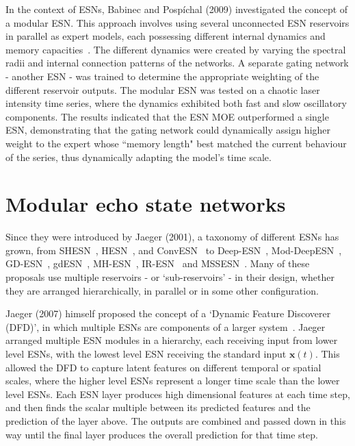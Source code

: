 In the context of ESNs, Babinec and Posp\'ichal (2009) investigated the concept of a modular ESN. This approach involves using several unconnected ESN reservoirs in parallel as expert models, each possessing different internal dynamics and memory capacities~\cite{babinec_pospichal_2009}. The different dynamics were created by varying the spectral radii and internal connection patterns of the networks. A separate gating network - another ESN - was trained to determine the appropriate weighting of the different reservoir outputs. The modular ESN was tested on a chaotic laser intensity time series, where the dynamics exhibited both fast and slow oscillatory components. The results indicated that the ESN MOE outperformed a single ESN, demonstrating that the gating network could dynamically assign higher weight to the expert whose ``memory length" best matched the current behaviour of the series, thus dynamically adapting the model's time scale. 

 

\section{Modular echo state networks}

Since they were introduced by Jaeger (2001), a taxonomy of different ESNs has grown, from SHESN~\cite{deng_and_zhang_2007}, HESN~\cite{jarvis_2010}, and ConvESN~\cite{ma_2021} to Deep-ESN~\cite{gallicchio_and_micheli_2017}, Mod-DeepESN~\cite{carmichael_2018}, GD-ESN~\cite{li_2022}, gdESN~\cite{wcislo_2021}, MH-ESN~\cite{lun_2023}, IR-ESN~\cite{argentieri_2022} and MSSESN~\cite{ma_chen_2013}.
Many of these proposals use multiple reservoirs - or `sub-reservoirs' - in their design, whether they are arranged hierarchically, in parallel or in some other configuration.

Jaeger (2007) himself proposed the concept of a `Dynamic Feature Discoverer (DFD)', in which multiple ESNs are components of a larger system~\cite{jaeger_2007}. Jaeger arranged multiple ESN modules in a hierarchy, each receiving input from lower level ESNs, with the lowest level ESN receiving the standard input $\mathbf{x}(t)$. This allowed the DFD to capture latent features on different temporal or spatial scales, where the higher level ESNs represent a longer time scale than the lower level ESNs. Each ESN layer produces high dimensional features at each time step, and then finds the scalar multiple between its predicted features and the prediction of the layer above. The outputs are combined and passed down in this way until the final layer produces the overall prediction for that time step.

